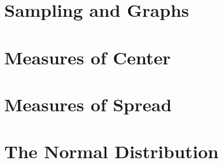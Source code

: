 \documentclass[9pt,letter,twoside,openright]{memoir}
\begin{document}
\section{Sampling and Graphs}


\section{Measures of Center}


\section{Measures of Spread}


\section{The Normal Distribution}

\end{document}
